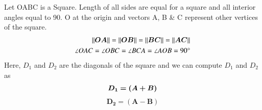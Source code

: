 \documentclass[journal,12pt,twocolumn]{article}
\providecommand{\norm}[1]{\left\lVert#1\right\rVert}
\begin{document}
Let OABC is a Square. Length of all sides are equal for a square and all interior angles equal to 90\degree.
O at the origin and vectors A, B \& C represent other vertices of the square.
\begin{align}
	\norm{\boldsymbol{OA}} = \norm{\boldsymbol{OB}} = \norm{\boldsymbol{BC}} = \norm{\boldsymbol{AC}} \\
\angle OAC = \angle OBC = \angle BCA = \angle AOB = 90\degree
\label{eq-1}
\end{align}
Here, $D_1$ and $D_2$ are the diagonals of the square and we can compute $D_1$ and $D_2$ as
\begin{equation}
	\boldsymbol{D_1 = (A + B) } \\
	\label{D1eq}
\end{equation}
\begin{equation}
	\boldsymbol{D_2 = (A - B) }
	\label{D2eq}
\end{equation}
\end{document}
